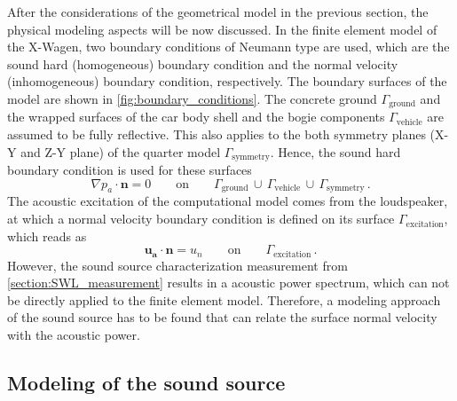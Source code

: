 {After the considerations of the geometrical model in the previous section, the physical modeling aspects will be now discussed. 
In the finite element model of the X-Wagen, two boundary conditions of Neumann type are used, which are the sound hard (homogeneous) boundary condition and the normal velocity (inhomogeneous) boundary condition, respectively. 
The boundary surfaces of the model are shown in \cref{fig:boundary_conditions}. The concrete ground $\Gamma_{\text{ground}}$ and the wrapped surfaces of the car body shell and the bogie components $\Gamma_{\text{vehicle}}$ are assumed to be fully reflective. 
This also applies to the both symmetry planes (X-Y and Z-Y plane) of the quarter model $\Gamma_{\text{symmetry}}$. Hence, the sound hard boundary condition is used for these surfaces
\begin{equation}
	\nabla p_a \cdot \boldsymbol{n} = 0\qquad\text{on}\qquad\Gamma_{\text{ground}}\,\cup\,\Gamma_{\text{vehicle}}\,\cup\,\Gamma_{\text{symmetry}}\,.
\end{equation}
The acoustic excitation of the computational model comes from the loudspeaker, at which a normal velocity boundary condition is defined on its surface $\Gamma_{\text{excitation}}$, which reads as
\begin{equation}
	\boldsymbol{u_a} \cdot \boldsymbol{n} = u_{n}\qquad\text{on}\qquad\Gamma_{\text{excitation}}\,.
\end{equation}
However, the sound source characterization measurement from \cref{section:SWL_measurement} results in a acoustic power spectrum, which can not be directly applied to the finite element model. Therefore, a modeling approach of the sound source has to be found that can relate the surface normal velocity with the acoustic power.

\subsection*{Modeling of the sound source}

}

